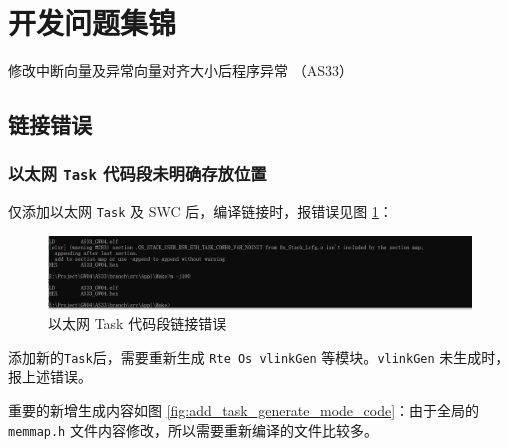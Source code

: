 \section{开发问题集锦}

\begin{introduction}
    \item {}
    \item {}
    \item {}
    \item {}
    \item 修改中断向量及异常向量对齐大小后程序异常 （AS33）
    \item {}
\end{introduction}

\subsection{链接错误}
\subsubsection{以太网 \lstinline{Task} 代码段未明确存放位置}\label{subsubsec:eth_ld_task_error}
仅添加以太网 \lstinline{Task} 及 SWC 后，编译链接时，报错误见图 \ref{fig:ld_error_eth_task}：

\begin{figure}[htbp]
    \centering
    \includegraphics[scale=0.6]{pic/eth_ld_error_task.png}
    \caption{以太网 Task 代码段链接错误}
    \label{fig:ld_error_eth_task}
\end{figure}

添加新的\lstinline{Task}后，需要重新生成 \lstinline{Rte Os vlinkGen} 等模块。\lstinline{vlinkGen} 未生成时，报上述错误。

重要的新增生成内容如图 \ref{fig:add_task_generate_mode_code}：由于全局的 \lstinline{memmap.h} 文件内容修改，所以需要重新编译的文件比较多。

